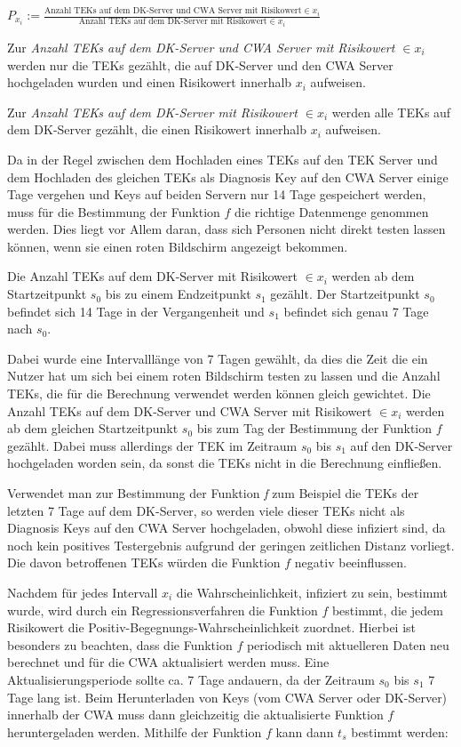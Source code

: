 \documentclass[conference,compsoc]{IEEEtran}
\begin{document}
\centerline{\text{ }}
\centerline{$P_{x_i} := \frac{\text{Anzahl TEKs auf dem DK-Server und CWA Server mit Risikowert} \in x_i}{\text{Anzahl TEKs auf dem DK-Server mit Risikowert} \in x_i}$}
\centerline{\text{ }}

Zur \textit{Anzahl TEKs auf dem DK-Server und CWA Server mit Risikowert $\in x_i$} werden nur die TEKs gezählt, 
die auf DK-Server und den CWA Server hochgeladen wurden und einen Risikowert innerhalb $x_i$ aufweisen. 

Zur \textit{Anzahl TEKs auf dem DK-Server mit Risikowert $\in x_i$} werden alle TEKs auf dem DK-Server gezählt, die einen Risikowert innerhalb $x_i$ aufweisen.

Da in der Regel zwischen dem Hochladen eines TEKs auf den TEK Server und dem Hochladen des gleichen TEKs als Diagnosis Key auf den CWA Server einige Tage vergehen und 
Keys auf beiden Servern nur 14 Tage gespeichert werden, muss für die Bestimmung der Funktion $f$ die richtige Datenmenge genommen werden.
Dies liegt vor Allem daran, dass sich Personen nicht direkt testen lassen können, wenn sie einen roten Bildschirm angezeigt bekommen.

Die Anzahl TEKs auf dem DK-Server mit Risikowert $\in x_i$ werden ab dem Startzeitpunkt $s_0$ bis zu einem Endzeitpunkt $s_1$ gezählt.
Der Startzeitpunkt $s_0$ befindet sich 14 Tage in der Vergangenheit und $s_1$ befindet sich genau 7 Tage nach $s_0$.

Dabei wurde eine Intervalllänge von 7 Tagen gewählt, da dies die Zeit die ein Nutzer hat um sich bei einem roten Bildschirm testen zu lassen und die Anzahl TEKs, 
die für die Berechnung verwendet werden können gleich gewichtet.
Die Anzahl TEKs auf dem DK-Server und CWA Server mit Risikowert $\in x_i$ werden ab dem gleichen Startzeitpunkt $s_0$ bis zum Tag der Bestimmung der Funktion $f$ gezählt.
Dabei muss allerdings der TEK im Zeitraum $s_0$ bis $s_1$ auf den DK-Server hochgeladen worden sein, da sonst die TEKs nicht in die Berechnung einfließen. 

Verwendet man zur Bestimmung der Funktion \textit{f} zum Beispiel die TEKs der letzten 7 Tage auf dem DK-Server, 
so werden viele dieser TEKs nicht als Diagnosis Keys auf den CWA Server hochgeladen, 
obwohl diese infiziert sind, da noch kein positives Testergebnis aufgrund der geringen zeitlichen Distanz vorliegt. 
Die davon betroffenen TEKs würden die Funktion $f$ negativ beeinflussen.

Nachdem für jedes Intervall $x_i$ die Wahrscheinlichkeit, infiziert zu sein, bestimmt wurde, wird durch ein Regressionsverfahren die Funktion $f$ bestimmt, 
die jedem Risikowert die Positiv-Begegnungs-Wahrscheinlichkeit zuordnet. 
Hierbei ist besonders zu beachten, dass die Funktion $f$ periodisch mit aktuelleren Daten neu berechnet und für die CWA aktualisiert werden muss. 
Eine Aktualisierungsperiode sollte ca. 7 Tage andauern, da der Zeitraum $s_0$ bis $s_1$ 7 Tage lang ist.
Beim Herunterladen von Keys (vom CWA Server oder DK-Server) innerhalb der CWA muss dann gleichzeitig die aktualisierte Funktion $f$ heruntergeladen werden. 
Mithilfe der Funktion $f$ kann dann $t_s$ bestimmt werden: 
\end{document}

